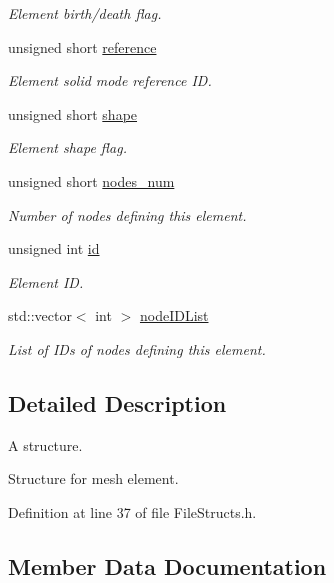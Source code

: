\begin{DoxyCompactItemize}
\begin{DoxyCompactList}\small\item\em Element birth/death flag. \end{DoxyCompactList}\item 
unsigned short \hyperlink{struct___elements_s_af9fa947d626f4bcdcb030fe4fab611c4}{reference}
\begin{DoxyCompactList}\small\item\em Element solid mode reference ID. \end{DoxyCompactList}\item 
unsigned short \hyperlink{struct___elements_s_aff93e58a2996c7dcae7441a7d6804da0}{shape}
\begin{DoxyCompactList}\small\item\em Element shape flag. \end{DoxyCompactList}\item 
unsigned short \hyperlink{struct___elements_s_a49bec774408021bd15702208237fb17f}{nodes\+\_\+num}
\begin{DoxyCompactList}\small\item\em Number of nodes defining this element. \end{DoxyCompactList}\item 
unsigned int \hyperlink{struct___elements_s_a782d0149d17748d22630799112b10680}{id}
\begin{DoxyCompactList}\small\item\em Element ID. \end{DoxyCompactList}\item 
std\+::vector$<$ int $>$ \hyperlink{struct___elements_s_a9e3631ebed48f8c5869f08f0970c251c}{node\+I\+D\+List}
\begin{DoxyCompactList}\small\item\em List of I\+Ds of nodes defining this element. \end{DoxyCompactList}\end{DoxyCompactItemize}


\subsection{Detailed Description}
A structure. 

Structure for mesh element. 

Definition at line 37 of file File\+Structs.\+h.



\subsection{Member Data Documentation}
